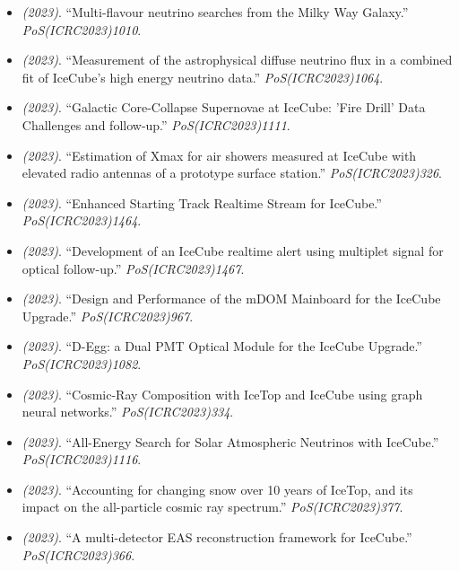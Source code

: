 \begin{itemize}
\item \textit{(2023)}. ``Multi-flavour neutrino searches from the Milky Way Galaxy.'' \textit{PoS(ICRC2023)1010}. 
\item \textit{(2023)}. ``Measurement of the astrophysical diffuse neutrino flux in a combined fit of IceCube's high energy neutrino data.'' \textit{PoS(ICRC2023)1064}. 
\item \textit{(2023)}. ``Galactic Core-Collapse Supernovae at IceCube: 'Fire Drill' Data Challenges and follow-up.'' \textit{PoS(ICRC2023)1111}. 
\item \textit{(2023)}. ``Estimation of Xmax for air showers measured at IceCube with elevated radio antennas of a prototype surface station.'' \textit{PoS(ICRC2023)326}. 
\item \textit{(2023)}. ``Enhanced Starting Track Realtime Stream for IceCube.'' \textit{PoS(ICRC2023)1464}. 
\item \textit{(2023)}. ``Development of an IceCube realtime alert using multiplet signal for optical follow-up.'' \textit{PoS(ICRC2023)1467}. 
\item \textit{(2023)}. ``Design and Performance of the mDOM Mainboard for the IceCube Upgrade.'' \textit{PoS(ICRC2023)967}. 
\item \textit{(2023)}. ``D-Egg: a Dual PMT Optical Module for the IceCube Upgrade.'' \textit{PoS(ICRC2023)1082}. 
\item \textit{(2023)}. ``Cosmic-Ray Composition with IceTop and IceCube using graph neural networks.'' \textit{PoS(ICRC2023)334}. 
\item \textit{(2023)}. ``All-Energy Search for Solar Atmospheric Neutrinos with IceCube.'' \textit{PoS(ICRC2023)1116}. 
\item \textit{(2023)}. ``Accounting for changing snow over 10 years of IceTop, and its impact on the all-particle cosmic ray spectrum.'' \textit{PoS(ICRC2023)377}. 
\item \textit{(2023)}. ``A multi-detector EAS reconstruction framework for IceCube.'' \textit{PoS(ICRC2023)366}. 
\end{itemize}
